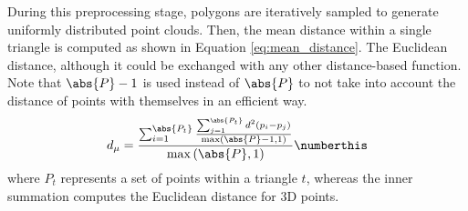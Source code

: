 During this preprocessing stage, polygons are iteratively sampled to generate uniformly distributed point clouds. Then, the mean distance within a single triangle is computed as shown in Equation \ref{eq:mean_distance}. The Euclidean distance, although it could be exchanged with any other distance-based function. Note that $\abs{P}-1$ is used instead of $\abs{P}$ to not take into account the distance of points with themselves in an efficient way. 
\begin{align*}
    d_{\mu} = \frac{\sum_{i=1}^{\abs{P_t}} \frac{\sum_{j=1}^{\abs{P_t}} d^{2}(p_{i} - p_{j})}{\max\left(\abs{P} - 1, 1\right)}}{\max\left(\abs{P}, 1\right)}
    \numberthis \label{eq:mean_distance}
\end{align*}
where $P_t$ represents a set of points within a triangle $t$, whereas the inner summation computes the Euclidean distance for 3D points.

